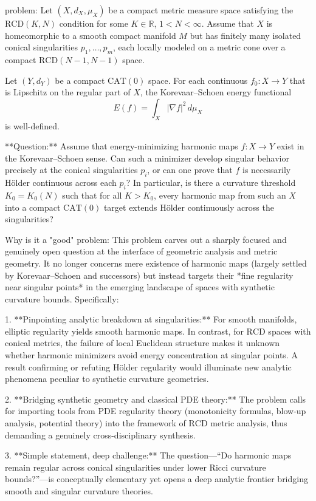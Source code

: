 problem:  
Let \((X, d_X, \mu_X)\) be a compact metric measure space satisfying the \(\mathrm{RCD}(K,N)\) condition for some \(K \in \mathbb{R}\), \(1 < N < \infty\). Assume that \(X\) is homeomorphic to a smooth compact manifold \(M\) but has finitely many isolated conical singularities \(p_1, \dots, p_m\), each locally modeled on a metric cone over a compact \(\mathrm{RCD}(N-1, N-1)\) space.  

Let \((Y, d_Y)\) be a compact \(\mathrm{CAT}(0)\) space. For each continuous \(f_0: X \to Y\) that is Lipschitz on the regular part of \(X\), the Korevaar–Schoen energy functional  
\[
E(f) = \int_X |\nabla f|^2 \, d\mu_X
\]
is well-defined.  

**Question:**  
Assume that energy-minimizing harmonic maps \(f: X \to Y\) exist in the Korevaar–Schoen sense. Can such a minimizer develop singular behavior precisely at the conical singularities \(p_i\), or can one prove that \(f\) is necessarily Hölder continuous across each \(p_i\)? In particular, is there a curvature threshold \(K_0 = K_0(N)\) such that for all \(K > K_0\), every harmonic map from such an \(X\) into a compact \(\mathrm{CAT}(0)\) target extends Hölder continuously across the singularities?

Why is it a "good" problem:  
This problem carves out a sharply focused and genuinely open question at the interface of geometric analysis and metric geometry. It no longer concerns mere existence of harmonic maps (largely settled by Korevaar–Schoen and successors) but instead targets their *fine regularity near singular points* in the emerging landscape of spaces with synthetic curvature bounds. Specifically:  

1. **Pinpointing analytic breakdown at singularities:**  
   For smooth manifolds, elliptic regularity yields smooth harmonic maps. In contrast, for \(\mathrm{RCD}\) spaces with conical metrics, the failure of local Euclidean structure makes it unknown whether harmonic minimizers avoid energy concentration at singular points. A result confirming or refuting Hölder regularity would illuminate new analytic phenomena peculiar to synthetic curvature geometries.  

2. **Bridging synthetic geometry and classical PDE theory:**  
   The problem calls for importing tools from PDE regularity theory (monotonicity formulas, blow-up analysis, potential theory) into the framework of \(\mathrm{RCD}\) metric analysis, thus demanding a genuinely cross-disciplinary synthesis.  

3. **Simple statement, deep challenge:**  
   The question—“Do harmonic maps remain regular across conical singularities under lower Ricci curvature bounds?”—is conceptually elementary yet opens a deep analytic frontier bridging smooth and singular curvature theories.  

